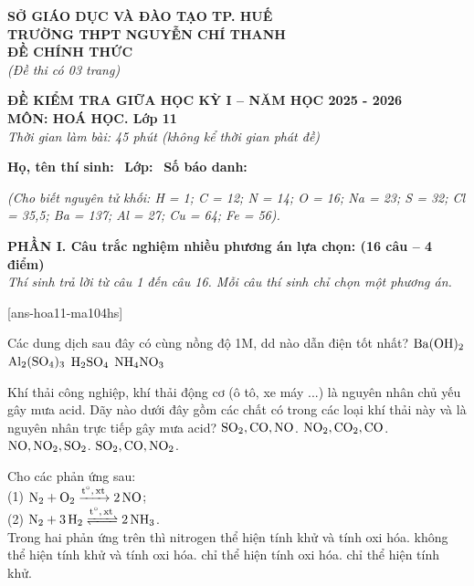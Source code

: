 \documentclass[12pt,a4paper]{article}
\begin{document}
\thispagestyle{firstpage}

\noindent
\begin{minipage}[t]{0.45\textwidth}
	\centering\fontsize{10pt}{12pt}\selectfont
	\textbf{SỞ GIÁO DỤC VÀ ĐÀO TẠO TP. HUẾ}\\
	\textbf{TRƯỜNG THPT NGUYỄN CHÍ THANH}\\
	\textbf{ĐỀ CHÍNH THỨC}\\
	\textit{(Đề thi có 03 trang)}
\end{minipage}\hfill
\begin{minipage}[t]{0.53\textwidth}
	\centering\small
	\textbf{ĐỀ KIỂM TRA GIỮA HỌC KỲ I -- NĂM HỌC 2025 - 2026}\\
	\textbf{MÔN: HOÁ HỌC. Lớp 11}\\
	\textit{Thời gian làm bài: 45 phút (không kể thời gian phát đề)}\\
\end{minipage}

\smallskip
\noindent\hrulefill
\smallskip

\noindent\textbf{Họ, tên thí sinh:} \dotfill\ \textbf{Lớp:} \dotfill\ \textbf{Số báo danh:} \dotfill

\smallskip
\noindent\textit{(Cho biết nguyên tử khối: H = 1; C = 12; N = 14; O = 16; Na = 23; S = 32; Cl = 35,5; Ba = 137; Al = 27; Cu = 64; Fe = 56).}
\smallskip

\noindent
\textbf{PHẦN I. Câu trắc nghiệm nhiều phương án lựa chọn: (16 câu -- 4 điểm)}\\
\textit{Thí sinh trả lời từ câu 1 đến câu 16. Mỗi câu thí sinh chỉ chọn một phương án.}

[ans-hoa11-ma104hs]

\begin{ex}
Các dung dịch sau đây có cùng nồng độ 1M, dd nào dẫn điện tốt nhất?
\choice
{$\ce{Ba(OH)2}$}
{$\ce{Al2(SO4)3}$}
{$\ce{H2SO4}$}
{$\ce{NH4NO3}$}
\loigiai{}
\end{ex}

\begin{ex}
Khí thải công nghiệp, khí thải động cơ (ô tô, xe máy ...) là nguyên nhân chủ yếu gây mưa acid. Dãy nào dưới đây gồm các chất có trong các loại khí thải này và là nguyên nhân trực tiếp gây mưa acid?
\choice
{$\ce{SO2}, \ce{CO}, \ce{NO}$.}
{$\ce{NO2}, \ce{CO2}, \ce{CO}$.}
{$\ce{NO}, \ce{NO2}, \ce{SO2}$.}
{$\ce{SO2}, \ce{CO}, \ce{NO2}$.}
\loigiai{}
\end{ex}

\begin{ex}
Cho các phản ứng sau:\\
(1) $\ce{N2 + O2 ->[t^\circ, xt] 2NO}$;\\
(2) $\ce{N2 + 3H2 <=>[t^\circ, xt] 2NH3}$.\\
Trong hai phản ứng trên thì nitrogen
\choice
{thể hiện tính khử và tính oxi hóa.}
{không thể hiện tính khử và tính oxi hóa.}
{chỉ thể hiện tính oxi hóa.}
{chỉ thể hiện tính khử.}
\loigiai{}
\end{ex}
\end{document}
